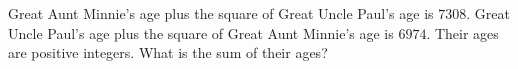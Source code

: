 Great Aunt Minnie's age plus the square of Great Uncle Paul's age is $7308$. Great Uncle Paul's age plus the square of Great Aunt Minnie's age is $6974$. Their ages are positive integers. What is the sum of their ages?
